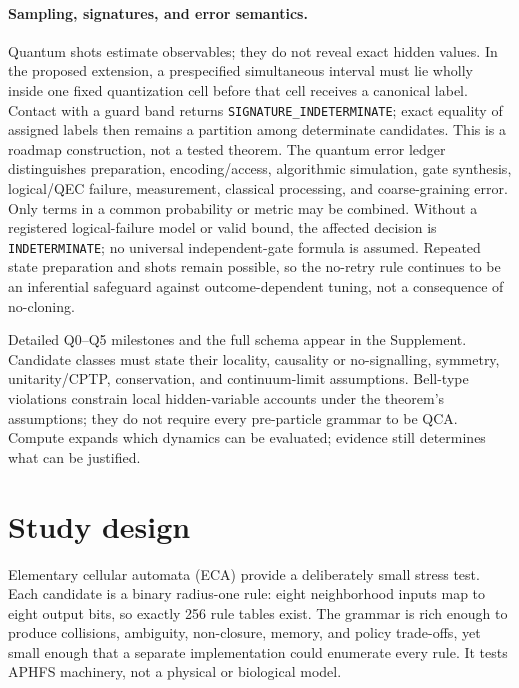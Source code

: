 \documentclass[10pt]{article}
\theoremstyle{definition}
\begin{document}
\paragraph{Sampling, signatures, and error semantics.}
Quantum shots estimate observables; they do not reveal exact hidden values. In the proposed
extension, a prespecified simultaneous interval must lie wholly inside one fixed quantization cell
before that cell receives a canonical label. Contact with a guard band returns
\texttt{SIGNATURE\_INDETERMINATE}; exact equality of assigned labels then remains a partition among
determinate candidates. This is a roadmap construction, not a tested theorem. The quantum error
ledger distinguishes preparation, encoding/access, algorithmic simulation, gate synthesis,
logical/QEC failure, measurement, classical processing, and coarse-graining error. Only terms in a
common probability or metric may be combined. Without a registered logical-failure model or valid
bound, the affected decision is \texttt{INDETERMINATE}; no universal independent-gate formula is
assumed. Repeated state preparation and shots remain possible, so the no-retry rule continues to
be an inferential safeguard against outcome-dependent tuning, not a consequence of no-cloning.

Detailed Q0--Q5 milestones and the full schema appear in the Supplement. Candidate classes must
state their locality, causality or no-signalling, symmetry, unitarity/CPTP, conservation, and
continuum-limit assumptions. Bell-type violations constrain local hidden-variable accounts under
the theorem's assumptions; they do not require every pre-particle grammar to be QCA. Compute
expands which dynamics can be evaluated; evidence still determines what can be justified.

\section{Study design}
\label{sec:design}

Elementary cellular automata (ECA) provide a deliberately small stress test. Each candidate is a
binary radius-one rule: eight neighborhood inputs map to eight output bits, so exactly 256 rule
tables exist. The grammar is rich enough to produce collisions, ambiguity, non-closure, memory,
and policy trade-offs, yet small enough that a separate implementation could enumerate every
rule. It tests APHFS machinery, not a physical or biological model.
\end{document}
